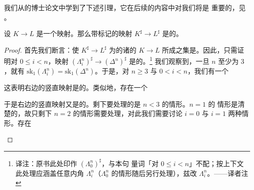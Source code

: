 我们从\trNguyen{}的博士论文中学到了下述引理，它在后续的内容中对我们将是
重要的，见 \cite[Lemma 3.2.3]{Ngu18}。

\begin{lemma}\label{lem:left-anodyne-sharp}
设 $K \to L$ 是一个\trLeftAnodyne{}映射。那么带标记\trSimplicialSet{}的映射
$K^\sharp \to L^\sharp$ 是\trMarkedAnodyne{}的。
\end{lemma}

\begin{proof}
首先我们断言：使 $K^\sharp \to L^\sharp$ 为\trMarkedAnodyne{}的诸\trSimplicialSet{}的%
\trMonomorphism{} $K \to L$ 所成之集是\trSaturated{}。因此，只需证明对
$0 \le i < n$，映射 $(\Lambda^n_i)^\sharp \to (\Delta^n)^\sharp$
是\trMarkedAnodyne{}的。\footnote{译注：原书此处印作 $(\Lambda^n_0)^\sharp$，与本句
量词「对 $0 \le i < n$」不配；按上下文此处理应涵盖任意内角 $\Lambda^n_i$（$\Lambda^n_0$
的情形随后另行处理），兹改 $\Lambda^n_i$。——译者注}
我们观察到，一旦 $n$ 至少为 $3$，就有 $\mathrm{sk}_1(\Lambda^n_i) = \mathrm{sk}_1(\Delta^n)$。于是，对 $n \ge 3$ 与 $0 < i < n$，我们有一个\trPushout{}%
\begin{center}
\end{center}
这表明右边的竖直映射是\trMarkedAnodyne{}的。类似地，存在一个\trPushout{}%
\begin{center}
\end{center}
于是右边的竖直映射又是\trMarkedAnodyne{}的。剩下要处理的是 $n < 3$ 的情形。$n = 1$ 的
情形是清楚的，故只剩下 $n = 2$ 的情形需要处理，对此我们需要讨论 $i = 0$ 与
$i = 1$ 两种情形。存在\trPushout{}%
\begin{center}
\end{center}
\end{proof}
